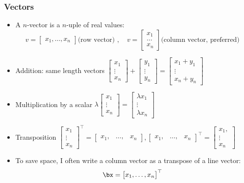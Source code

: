 \documentclass[8pt]{beamer}
\begin{document}
\begin{frame}
  \frametitle{Vectors}
  \begin{itemize}
  \item A $n$-vector is a $n$-uple of real values:
    $$
    v =
    \begin{bmatrix}
      x_1, \dots,  x_n
    \end{bmatrix}
    \text{(row vector) },\quad
    v =
    \begin{bmatrix}
      x_1\\\dots\\x_n
    \end{bmatrix}
    \text{(column vector, preferred)}
    $$
  \item Addition: same length vectors
    $
    \begin{bmatrix}
      x_1\\\vdots\\x_n
    \end{bmatrix}
    +
    \begin{bmatrix}
      y_1\\\vdots\\y_n
    \end{bmatrix}
    =
    \begin{bmatrix}
      x_1+y_1\\\vdots\\x_n+y_n
    \end{bmatrix}
    $
  \item Multiplication by a scalar
    $
    \lambda\begin{bmatrix}
      x_1\\\vdots\\x_n
    \end{bmatrix}
    = 
    \begin{bmatrix}
      \lambda x_1\\\vdots\\\lambda x_n
    \end{bmatrix}
    $
  \item Transposition  
    $
    \begin{bmatrix}
      x_1\\\vdots\\x_n
    \end{bmatrix}^\top =
    \begin{bmatrix}
      x_1,&\dots,&x_n
    \end{bmatrix}
    ,
    \begin{bmatrix}
      x_1,&\dots,&x_n
    \end{bmatrix}^\top =
    \begin{bmatrix}
      x_1,\\\vdots\\x_n
    \end{bmatrix}
    $
  \item To save space, I often write a column vector as a transpose of a line vector:
    $$
    \bx =   \begin{bmatrix}
      x_1,\dots, x_n
    \end{bmatrix}^\top
    $$
  \end{itemize}
\end{frame}
\end{document}
